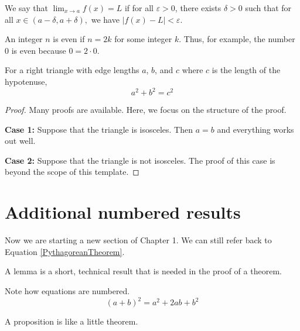 \pagebreak  %

\begin{definition}
We say that $\lim_{x \to a} f(x) = L$ if for all $\varepsilon > 0$, there exists $\delta > 0$ such that for all $x \in (a-\delta,a+\delta),$ we have $|f(x) - L| < \varepsilon$.
\end{definition}

\begin{definition}
An integer $n$ is even if $n=2k$ for some integer $k$.
Thus, for example, the number $0$ is even because $0=2\cdot 0$.
\end{definition}

\begin{theorem}
For a right triangle with edge lengths $a$, $b$, and $c$ where $c$ is the length of the hypotenuse, 
\begin{equation} \label{PythagoreanTheorem}
    a^2 + b^2 = c^2
\end{equation}
\end{theorem}
\begin{proof}
Many proofs are available.  Here, we focus on the structure of the proof.

\noindent
{\bf Case 1:} Suppose that the triangle is isosceles.
Then $a = b$ and everything works out well.

\noindent
{\bf Case 2:} Suppose that the triangle is not isosceles.
The proof of this case is beyond the scope of this template.
\end{proof}

\section{Additional numbered results}
\label{AdditionalNumberedResults}

Now we are starting a new section of Chapter 1.
We can still refer back to Equation \ref{PythagoreanTheorem}.

\begin{lemma}
A lemma is a short, technical result that is needed in the proof of a theorem.
\end{lemma}

Note how equations are numbered.
\begin{equation} \label{squarebinomial}
    (a+b)^2 = a^2 + 2 ab + b^2
\end{equation}

\begin{proposition}
A proposition is like a little theorem.
\end{proposition}

